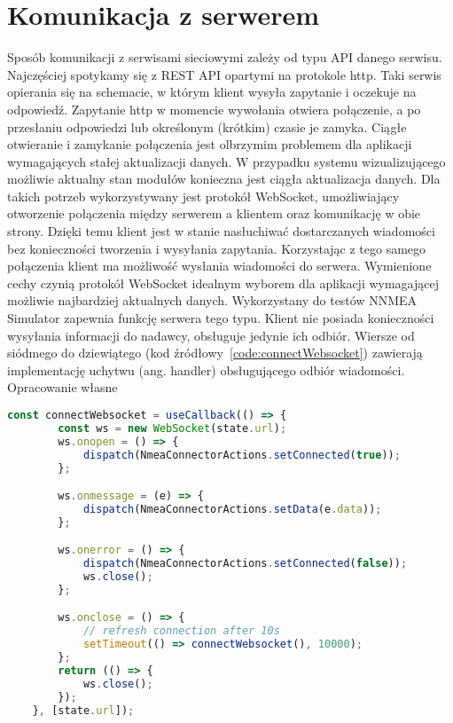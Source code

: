 \documentclass[skorowidz,skroty]{dyplomWEZUT}
\begin{document}
\section{Komunikacja z serwerem}\label{sec: server communication} 
Sposób komunikacji z serwisami sieciowymi zależy od typu API danego serwisu. Najczęściej spotykamy się z REST API opartymi na protokole http. Taki serwis opierania się na schemacie, w którym klient wysyła zapytanie i oczekuje na odpowiedź. Zapytanie http w momencie wywołania otwiera połączenie, a po przesłaniu odpowiedzi lub określonym (krótkim) czasie je zamyka. Ciągłe otwieranie i zamykanie połączenia jest olbrzymim problemem dla aplikacji wymagających stałej aktualizacji danych. W przypadku systemu wizualizującego możliwie aktualny stan modułów konieczna jest ciągła aktualizacja danych. Dla takich potrzeb wykorzystywany jest protokół WebSocket, umożliwiający otworzenie połączenia między serwerem a klientem oraz komunikację w obie strony. Dzięki temu klient jest w stanie nasłuchiwać dostarczanych wiadomości bez konieczności tworzenia i wysyłania zapytania. Korzystając z tego samego połączenia klient ma możliwość wysłania wiadomości do serwera. Wymienione cechy czynią protokół WebSocket idealnym wyborem dla aplikacji wymagającej możliwie najbardziej aktualnych danych. Wykorzystany do testów NNMEA Simulator zapewnia funkcję serwera tego typu. Klient nie posiada konieczności wysyłania informacji do nadawcy, obsługuje jedynie ich odbiór. Wiersze od siódmego do dziewiątego (kod źródłowy~\ref{code:connectWebsocket}) zawierają implementację uchytwu (ang. handler) obsługującego odbiór wiadomości.
{Opracowanie własne}{\label{code: connectWebsocket}}
\begin{lstlisting}[language=JavaScript]
  const connectWebsocket = useCallback(() => {
        const ws = new WebSocket(state.url);
        ws.onopen = () => {
            dispatch(NmeaConnectorActions.setConnected(true));
        };

        ws.onmessage = (e) => {
            dispatch(NmeaConnectorActions.setData(e.data));
        };

        ws.onerror = () => {
            dispatch(NmeaConnectorActions.setConnected(false));
            ws.close();
        };

        ws.onclose = () => {
            // refresh connection after 10s
            setTimeout(() => connectWebsocket(), 10000);
        };
        return (() => {
            ws.close();
        });
    }, [state.url]);    
    
\end{lstlisting}
\end{document}

